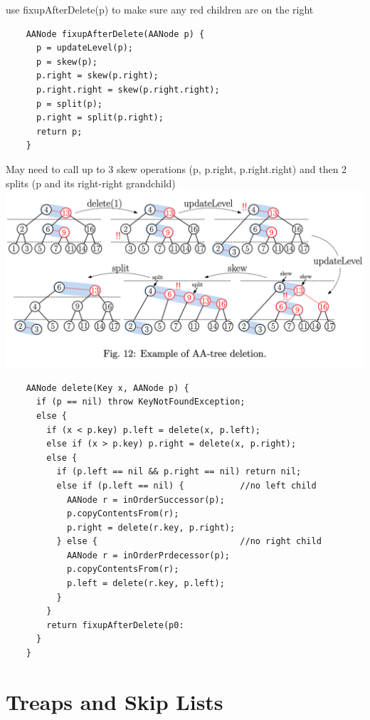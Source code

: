 \documentclass{article}
\begin{document}
  \indent use fixupAfterDelete(p) to make sure any red children are on the right \\
  \begin{lstlisting}
    AANode fixupAfterDelete(AANode p) {
      p = updateLevel(p);
      p = skew(p);
      p.right = skew(p.right);
      p.right.right = skew(p.right.right);
      p = split(p);
      p.right = split(p.right);
      return p;
    }
  \end{lstlisting}
  \indent May need to call up to 3 skew operations (p, p.right, p.right.right) and then 2 splits (p and its right-right grandchild) \\
  \includegraphics[width=\textwidth]{DeletionAATree}
  \begin{lstlisting}
    AANode delete(Key x, AANode p) {
      if (p == nil) throw KeyNotFoundException;
      else {
        if (x < p.key) p.left = delete(x, p.left);
        else if (x > p.key) p.right = delete(x, p.right);
        else {
          if (p.left == nil && p.right == nil) return nil;
          else if (p.left == nil) {           //no left child
            AANode r = inOrderSuccessor(p);
            p.copyContentsFrom(r);
            p.right = delete(r.key, p.right);
          } else {                            //no right child
            AANode r = inOrderPrdecessor(p);
            p.copyContentsFrom(r);
            p.left = delete(r.key, p.left);
          }
        }
        return fixupAfterDelete(p0:
      }
    }
  \end{lstlisting}
  \section{Treaps and Skip Lists}
\end{document}
